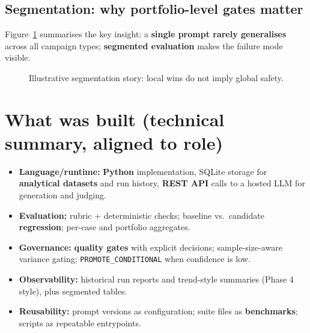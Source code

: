 \documentclass[11pt,a4paper]{article}
\newcommand{\JD}[1]{\colorbox{KwFill}{\textbf{\small #1}}}
\begin{document}
\subsection{Segmentation: why portfolio-level gates matter}
Figure~\ref{fig:segment} summarises the key insight: a \textbf{single prompt rarely generalises} across all campaign types; \JD{segmented evaluation} makes the failure mode visible.

\begin{figure}[htbp]
\centering
{}
\caption{Illustrative segmentation story: local wins do not imply global safety.}
\label{fig:segment}
\end{figure}

\section{What was built (technical summary, aligned to role)}
\begin{itemize}
  \item \textbf{Language/runtime:} \JD{Python} implementation, SQLite storage for \JD{analytical datasets} and run history, \JD{REST API} calls to a hosted LLM for generation and judging.
  \item \textbf{Evaluation:} rubric + deterministic checks; baseline vs.\ candidate \JD{regression}; per-case and portfolio aggregates.
  \item \textbf{Governance:} \JD{quality gates} with explicit decisions; sample-size-aware variance gating; \texttt{PROMOTE\_CONDITIONAL} when confidence is low.
  \item \textbf{Observability:} historical run reports and trend-style summaries (Phase 4 style), plus segmented tables.
  \item \textbf{Reusability:} prompt versions as configuration; suite files as \JD{benchmarks}; scripts as repeatable entrypoints.
\end{itemize}
\end{document}
